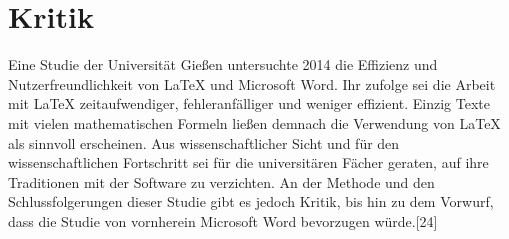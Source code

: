 
\section{Kritik}

Eine Studie der Universität Gießen untersuchte 2014 die Effizienz und Nutzerfreundlichkeit von LaTeX und Microsoft Word. Ihr zufolge sei die Arbeit mit LaTeX zeitaufwendiger, fehleranfälliger und weniger effizient.\cite{Knauff} Einzig Texte mit vielen mathematischen Formeln ließen demnach die Verwendung von LaTeX als sinnvoll erscheinen. Aus wissenschaftlicher Sicht und für den wissenschaftlichen Fortschritt sei für die universitären Fächer geraten, auf ihre Traditionen mit der Software zu verzichten. An der Methode und den Schlussfolgerungen dieser Studie gibt es jedoch Kritik, bis hin zu dem Vorwurf, dass die Studie von vornherein Microsoft Word bevorzugen würde.[24]